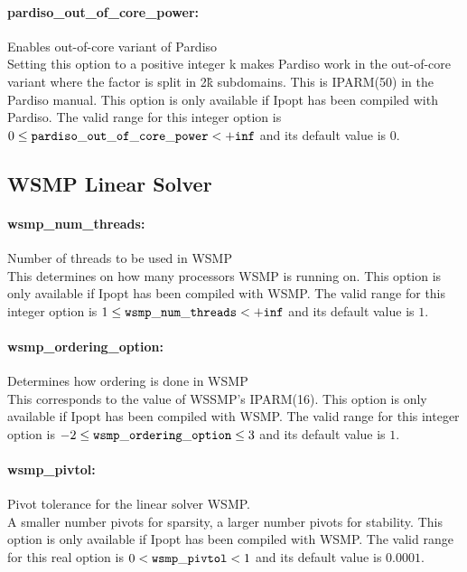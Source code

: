 \paragraph{pardiso\_out\_of\_core\_power:}\label{sec:pardiso_out_of_core_power} Enables out-of-core variant of Pardiso $\;$ \\
 Setting this option to a positive integer k makes
Pardiso work in the out-of-core variant where the
factor is split in 2\^k subdomains.  This is
IPARM(50) in the Pardiso manual.  This option is
only available if Ipopt has been compiled with
Pardiso. The valid range for this integer option is
$0 \le {\tt pardiso\_out\_of\_core\_power } <  {\tt +inf}$
and its default value is $0$.


\subsection{WSMP Linear Solver}

\paragraph{wsmp\_num\_threads:}\label{sec:wsmp_num_threads} Number of threads to be used in WSMP $\;$ \\
 This determines on how many processors WSMP is
running on.  This option is only available if
Ipopt has been compiled with WSMP. The valid range for this integer option is
$1 \le {\tt wsmp\_num\_threads } <  {\tt +inf}$
and its default value is $1$.


\paragraph{wsmp\_ordering\_option:}\label{sec:wsmp_ordering_option} Determines how ordering is done in WSMP $\;$ \\
 This corresponds to the value of WSSMP's
IPARM(16).  This option is only available if
Ipopt has been compiled with WSMP. The valid range for this integer option is
$-2 \le {\tt wsmp\_ordering\_option } \le 3$
and its default value is $1$.


\paragraph{wsmp\_pivtol:}\label{sec:wsmp_pivtol} Pivot tolerance for the linear solver WSMP. $\;$ \\
 A smaller number pivots for sparsity, a larger
number pivots for stability.  This option is only
available if Ipopt has been compiled with WSMP. The valid range for this real option is 
$0 <  {\tt wsmp\_pivtol } <  1$
and its default value is $0.0001$.


